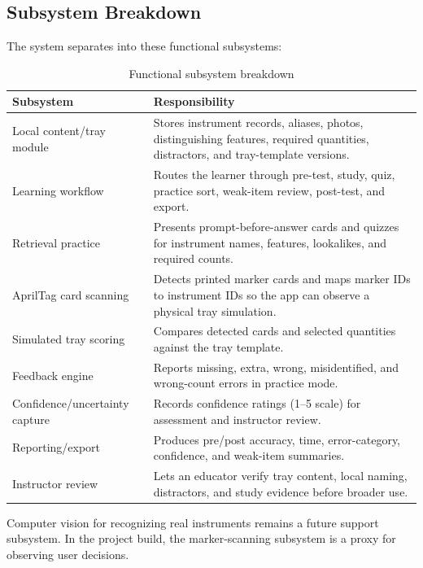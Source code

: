 \documentclass[10pt,a4paper]{article}
\begin{document}
\subsection{Subsystem Breakdown}


The system separates into these functional subsystems:
\begin{table}[H]
\centering
\caption{Functional subsystem breakdown}
\label{tab:functional-subsystem-breakdown}
\small\renewcommand{\arraystretch}{1.2}\setlength{\tabcolsep}{4pt}
\begin{tabularx}{\textwidth}{|>{\raggedright\arraybackslash}X|>{\raggedright\arraybackslash}X|}
\hline
Subsystem & Responsibility \\
\hline
Local content/tray module & Stores instrument records, aliases, photos, distinguishing features, required quantities, distractors, and tray-template versions. \\
\hline
Learning workflow & Routes the learner through pre-test, study, quiz, practice sort, weak-item review, post-test, and export. \\
\hline
Retrieval practice & Presents prompt-before-answer cards and quizzes for instrument names, features, lookalikes, and required counts. \\
\hline
AprilTag card scanning & Detects printed marker cards and maps marker IDs to instrument IDs so the app can observe a physical tray simulation. \\
\hline
Simulated tray scoring & Compares detected cards and selected quantities against the tray template. \\
\hline
Feedback engine & Reports missing, extra, wrong, misidentified, and wrong-count errors in practice mode. \\
\hline
Confidence/uncertainty capture & Records confidence ratings (1--5 scale) for assessment and instructor review. \\
\hline
Reporting/export & Produces pre/post accuracy, time, error-category, confidence, and weak-item summaries. \\
\hline
Instructor review & Lets an educator verify tray content, local naming, distractors, and study evidence before broader use. \\
\hline
\end{tabularx}
\end{table}
Computer vision for recognizing real instruments remains a future support
subsystem. In the project build, the marker-scanning subsystem is a
proxy for observing user decisions.
\end{document}
